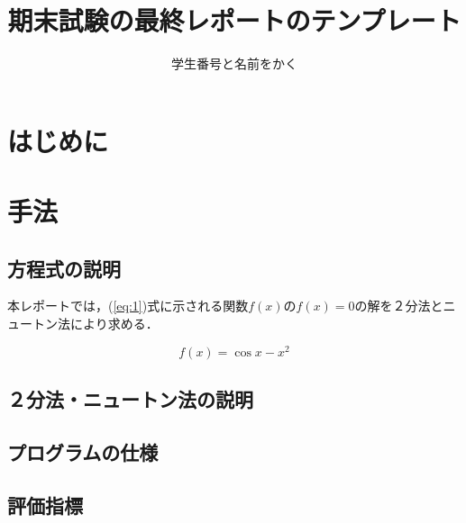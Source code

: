 \documentclass[uplatex]{jsarticle}
\begin{document}
\title{期末試験の最終レポートのテンプレート}
\author{学生番号と名前をかく}

\maketitle


\section{はじめに}

\section{手法}

\subsection{方程式の説明}

本レポートでは，(\ref{eq:1})式に示される関数$f(x)$の$f(x)=0$の解を２分法とニュートン法により求める．

\begin{equation}
f(x)=\cos x- x^2\label{eq:1}
\end{equation}

\subsection{２分法・ニュートン法の説明}

\subsection{プログラムの仕様}

\subsection{評価指標}
\end{document}
